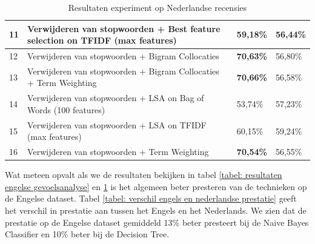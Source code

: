 \begin{table}[h]
\begin{adjustbox}{width=1\textwidth}
\begin{tabular}{|l|l|l|l|}
11       & Verwijderen van stopwoorden + Best feature selection on TFIDF (max features)         & 59,18\%                                 & 56,44\%                        \\ \hline
12       & Verwijderen van stopwoorden + Bigram Collocaties                                     & {\bf 70,63\%}                           & 56,80\%                        \\ \hline
13       & Verwijderen van stopwoorden + Bigram Collocaties + Term Weighting                    & {\bf 70,66\%}                           & 56,58\%                        \\ \hline
14       & Verwijderen van stopwoorden + LSA on Bag of Words (100 features)                     & 53,74\%                                 & 57,23\%                        \\ \hline
15       & Verwijderen van stopwoorden + LSA on TFIDF (max features)                            & 60,15\%                                 & 59,24\%                        \\ \hline
16       & Verwijderen van stopwoorden + Term Weighting                                         & {\bf 70,54\%}                           & 56,55\%                        \\ \hline
\end{tabular}
\end{adjustbox}

\caption{Resultaten experiment op Nederlandse recensies}
\label{tabel: resultaten Nederlandse gevoelsanalyse}
\end{table}


Wat meteen opvalt als we de resultaten bekijken in tabel \ref{tabel: resultaten engelse gevoelsanalyse} en \ref{tabel: resultaten Nederlandse gevoelsanalyse} is het algemeen beter presteren van de technieken op de Engelse dataset. Tabel \ref{tabel: verschil engels en nederlandse prestatie} geeft het verschil in prestatie aan tussen het Engels en het Nederlands. We zien dat de prestatie op de Engelse dataset gemiddeld 13\% beter presteert bij de Naive Bayes Classifier en 10\% beter bij de Decision Tree.


